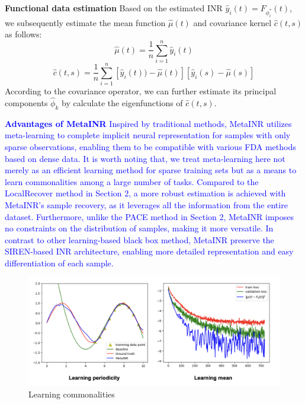 \documentclass{article}
\begin{document}
\textbf{Functional data estimation}
Based on the estimated INR $\hat{y}_i(t)=F_{\phi^*_i}(t)$, we subsequently estimate the mean function $\hat{\mu}(t)$ and covariance kernel $\hat{c}(t,s)$ as follows:
$$
\hat{\mu}(t)= \frac{1}{n} \sum_{i=1}^n \hat{y}_i(t)
$$
$$
\hat{c}(t,s)= \frac{1}{n} \sum_{i=1}^n  [\hat{y}_i(t))-\hat{\mu}(t)] [\hat{y}_i(s)-\hat{\mu}(s) ]
$$
According to the covariance operator, we can further estimate its principal components $\hat{\phi}_k$ by calculate the eigenfunctions of $\hat{c}(t,s)$.

\textcolor{blue}{
\textbf{Advantages of MetaINR}
Inspired by traditional methods, MetaINR utilizes meta-learning to complete implicit neural representation for samples with only sparse observations, 
enabling them to be compatible with various FDA methods based on dense data.
It is worth noting that, we treat meta-learning here not merely as an efficient learning method for sparse training sets but as a means to learn commonalities among a large number of tasks.
Compared to the LocalRecover method in Section 2, a more robust estimation is achieved with MetaINR's sample recovery, as it leverages all the information from the entire dataset. 
Furthermore, unlike the PACE method in Section 2, 
MetaINR imposes no constraints on the distribution of samples, making it more versatile.
In contrast to other learning-based black box method, MetaINR preserve the SIREN-based INR architecture, enabling more detailed representation and easy differentiation of each sample.
}



\begin{figure}
  \centering
  \includegraphics[width=\textwidth]{learning_commonalities.png}
  \caption{Learning commonalities}
  \label{Learning commonalities}
\end{figure}
\end{document}
